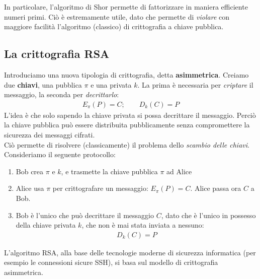 \documentclass[../../InformazioneQuantistica.tex]{subfiles}
\begin{document}
In particolare, l'algoritmo di Shor permette di fattorizzare in maniera efficiente numeri primi. Ciò è estremamente utile, dato che permette di \textit{violare} con maggiore facilità l'algoritmo (classico) di crittografia a chiave pubblica.

\subsection{La crittografia RSA}
Introduciamo una nuova tipologia di crittografia, detta \textbf{asimmetrica}. Creiamo due \textbf{chiavi}, una pubblica $\pi$ e una privata $k$. La prima è necessaria per \textit{criptare} il messaggio, la seconda per \textit{decrittarlo}:
\begin{align*}
E_\pi (P) = C; \qquad D_k(C) = P
\end{align*}
L'idea è che solo sapendo la chiave privata si possa decrittare il messaggio. Perciò la chiave pubblica può essere distribuita pubblicamente senza compromettere la sicurezza dei messaggi cifrati.\\
Ciò permette di risolvere (classicamente) il problema dello \textit{scambio delle chiavi}. Consideriamo il seguente protocollo:
\begin{enumerate}
\item Bob crea $\pi$ e $k$, e trasmette la chiave pubblica $\pi$ ad Alice
\item Alice usa $\pi$ per crittografare un messaggio: $E_\pi (P) = C$. Alice passa ora $C$ a Bob.
\item Bob è l'unico che può decrittare il messaggio $C$, dato che è l'unico in possesso della chiave privata $k$, che non è mai stata inviata a nessuno:
\begin{align*}
D_k(C) = P
\end{align*}
\end{enumerate}

L'algoritmo RSA, alla base delle tecnologie moderne di sicurezza informatica (per esempio le connessioni sicure SSH), si basa sul modello di crittografia asimmetrica.
\end{document}
